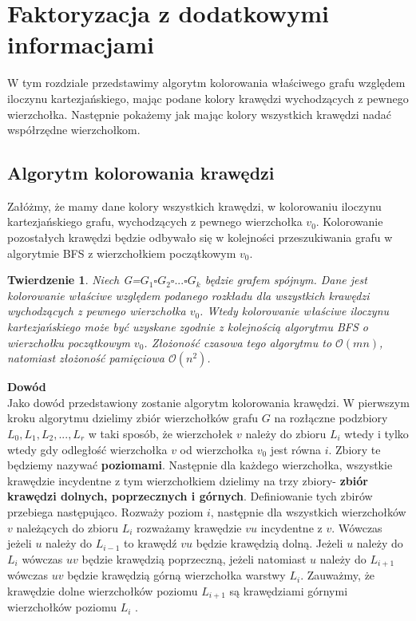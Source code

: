\documentclass[12pt,a4paper,titlepage]{article}
\newtheorem{twr}{Twierdzenie}
\newcommand\tab[1][1cm]{\hspace*{#1}}
\begin{document}
\section{Faktoryzacja z dodatkowymi informacjami}
W tym rozdziale przedstawimy algorytm kolorowania właściwego grafu względem iloczynu kartezjańskiego, mając podane kolory krawędzi wychodzących z pewnego wierzchołka. Następnie pokażemy jak mając kolory wszystkich krawędzi nadać współrzędne wierzchołkom. 
\\
\subsection{Algorytm kolorowania krawędzi}
Załóżmy, że mamy dane kolory wszystkich krawędzi, w kolorowaniu iloczynu kartezjańskiego grafu, wychodzących z pewnego wierzchołka $v_0$. Kolorowanie pozostałych krawędzi będzie odbywało się w kolejności przeszukiwania grafu w algorytmie BFS z wierzchołkiem początkowym $v_0$. \\
\begin{twr}Niech G=$G_1 \square G_2 \square ... \square G_k$ będzie grafem spójnym. Dane jest kolorowanie właściwe względem podanego rozkładu dla wszystkich krawędzi wychodzących z pewnego wierzchołka $v_0$. Wtedy kolorowanie właściwe iloczynu kartezjańskiego może być uzyskane zgodnie z kolejnością algorytmu BFS o wierzchołku początkowym $v_0$. Złożoność czasowa tego algorytmu to $\mathcal{O}(mn)$, natomiast złożoność pamięciowa $\mathcal{O}(n^2)$.
\end{twr}
\tab[-0.6cm]\textbf{Dowód}\\
\tab[0.6cm]Jako dowód przedstawiony zostanie algorytm kolorowania krawędzi. W pierwszym kroku algorytmu dzielimy zbiór wierzchołków grafu $G$ na rozłączne podzbiory $L_0 , L_1, L_2 , ..., L_r$ w taki sposób, że wierzchołek $v$ należy do zbioru $L_i$ wtedy i tylko wtedy gdy odległość wierzchołka $v$ od wierzchołka $v_0$ jest równa $i$. Zbiory te będziemy nazywać \textbf{poziomami}. Następnie dla każdego wierzchołka, wszystkie krawędzie incydentne z tym wierzchołkiem dzielimy na trzy zbiory- \textbf{zbiór krawędzi dolnych, poprzecznych i górnych}. Definiowanie tych zbirów przebiega następująco. Rozważy poziom $i$, następnie dla wszystkich wierzchołków $v$ należących do zbioru $L_i$ rozważamy krawędzie $vu$ incydentne z $v$. Wówczas jeżeli $u$ należy do $L_{i-1}$ to krawędź $vu$ będzie krawędzią dolną. Jeżeli $u$ należy do $L_i$ wówczas $uv$ będzie krawędzią poprzeczną, jeżeli natomiast $u$ należy do $L_{i+1}$ wówczas $uv$ będzie krawędzią górną wierzchołka warstwy $L_i$. Zauważmy, że krawędzie dolne wierzchołków poziomu $L_{i+1}$ są krawędziami górnymi wierzchołków poziomu $L_{i}$ .\\
\end{document}
